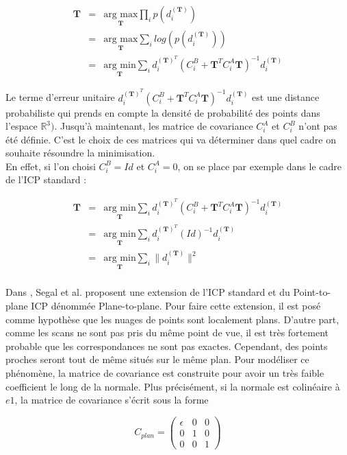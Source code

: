 \begin{eqnarray}
\mathbf{T} &=& \underset{\mathbf{T}}{\text{arg max}} \prod_{i} p(d_{i}^{(\mathbf{T})}) \\
&=& \underset{\mathbf{T}}{\text{arg max}} \sum_{i} log(p(d_{i}^{(\mathbf{T})})) \\
&=& \underset{\mathbf{T}}{\text{arg min}} \sum_{i} d_{i}^{(\mathbf{T})^T}(C_{i}^B + \mathbf{T}^{T}C_{i}^{A}\mathbf{T})^{-1}d_{i}^{(\mathbf{T})}
\end{eqnarray}

Le terme d'erreur unitaire $d_{i}^{(\mathbf{T})^T}(C_{i}^B+\mathbf{T}^{T}C_{i}^{A}\mathbf{T})^{-1}d_{i}^{(\mathbf{T})}$  est une distance probabiliste qui prends en compte la densité de probabilité des points dans l'espace $\mathbb{R}^{3})$. Jusqu'à maintenant, les matrice de covariance $C_{i}^A$ et $C_{i}^B$ n'ont pas été définie. C'est le choix de ces matrices qui va déterminer dans quel cadre on souhaite résoundre la minimisation.\\

En effet, si l'on choisi $C_{i}^B = Id$ et $C_{i}^A = 0$, on se place par exemple dans le cadre de l'ICP standard :

\begin{eqnarray}
\mathbf{T} &=& \underset{\mathbf{T}}{\text{arg min}} \sum_{i} d_{i}^{(\mathbf{T})^T}(C_{i}^B + \mathbf{T}^{T}C_{i}^{A}\mathbf{T})^{-1}d_{i}^{(\mathbf{T})}\\
&=& \underset{\mathbf{T}}{\text{arg min}} \sum_{i} d_{i}^{(\mathbf{T})^T}(Id)^{-1}d_{i}^{(\mathbf{T})}\\
&=& \underset{\mathbf{T}}{\text{arg min}} \sum_{i} \|d_{i}^{(\mathbf{T})}\|^2\\
\end{eqnarray}

Dans \cite{bib_gicp}, Segal et al. proposent une extension de l'ICP standard et du Point-to-plane ICP  dénommée Plane-to-plane. Pour faire cette extension, il est posé comme hypothèse que les nuages de points sont localement plans. D'autre part, comme les scans ne sont pas pris du même point de vue, il est très fortement probable que les correspondances ne sont pas exactes. Cependant, des points proches seront tout de même situés sur le même plan. Pour modéliser ce phénomène, la matrice de covariance est construite pour avoir un très faible coefficient le long de la normale. Plus précisément, si la normale est colinéaire à $e1$, la matrice de covariance s'écrit sous la forme 

\begin{equation}C_{plan} = \begin{pmatrix} 
 \epsilon & 0 & 0 \\
 0 & 1 & 0 \\ 
 0 & 0 & 1 
 \end{pmatrix}
\end{equation}

